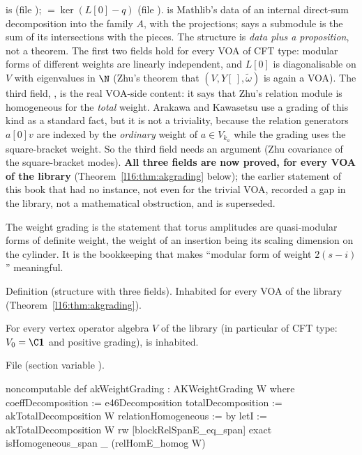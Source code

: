 \begin{dictionary}
 is  (file );
 $=\ker(L[0]-q)$ (file ).
\allowbreak{} is Mathlib's data of an internal direct-sum decomposition into the family $A$, with the
projections;  says a submodule is the sum of its intersections with the pieces. The structure is
\emph{data plus a proposition}, not a theorem. The first two fields hold for every VOA of CFT type: modular
forms of different weights are linearly independent, and $L[0]$ is diagonalisable on $V$ with eigenvalues in $\N$ (Zhu's
theorem that $(V,Y[\,],\tilde\omega)$ is again a VOA). The third field, , is the real
VOA-side content: it says that Zhu's relation module is homogeneous for the \emph{total} weight. Arakawa
and Kawasetsu use a grading of this kind as a standard fact, but it is not a triviality, because the relation generators
$a[0]v$ are indexed by the \emph{ordinary} weight of $a\in V_{k_a}$ while the grading uses the square-bracket weight. So
the third field needs an argument (Zhu covariance of the square-bracket modes). \textbf{All three fields are now proved,
for every VOA of the library} (Theorem~\ref{l16:thm:akgrading} below); the earlier statement of this book that
 had no instance, not even for the trivial VOA, recorded a gap in the library, not a mathematical
obstruction, and is superseded.
\end{dictionary}

\begin{physics}
The weight grading is the statement that torus amplitudes are quasi-modular forms of definite weight, the weight of an
insertion being its scaling dimension on the cylinder. It is the bookkeeping that makes ``modular form of weight
$2(s-i)$'' meaningful.
\end{physics}

\begin{status}
Definition (structure with three fields). Inhabited for every VOA of the library (Theorem~\ref{l16:thm:akgrading}).
\end{status}

\begin{theorem}\label{l16:thm:akgrading}
For every vertex operator algebra $V$ of the library (in particular of CFT type: $V_0=\C\lsixteenvac$ and positive grading),
 is inhabited.
\end{theorem}
\noindent File  (section variable
).
\begin{leancode}
noncomputable def akWeightGrading : AKWeightGrading W where
  coeffDecomposition := e46Decomposition
  totalDecomposition := akTotalDecomposition W
  relationHomogeneous := by
    letI := akTotalDecomposition W
    rw [blockRelSpanE_eq_span]
    exact isHomogeneous_span _ (relHomE_homog W)
\end{leancode}

